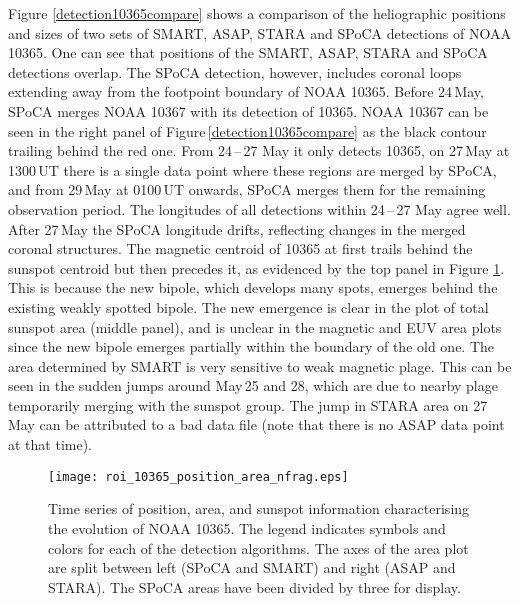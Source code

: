 Figure \ref{detection10365compare} shows a comparison of the heliographic
positions and sizes of two sets of \gls{SMART}, \gls{ASAP}, \gls{STARA} and \gls{SPoCA} detections of NOAA 10365. One can see that positions of the \gls{SMART}, \gls{ASAP}, \gls{STARA} and \gls{SPoCA} detections overlap. The \gls{SPoCA} detection, however, includes coronal loops extending away from the footpoint boundary of NOAA 10365.
Before 24\,May, \gls{SPoCA} merges NOAA 10367 with its detection of 10365. NOAA 10367 can be seen in the right panel of Figure\,\ref{detection10365compare} as the black contour trailing behind the red one. From 24\,--\,27 May it only detects 10365, on 27\,May at 1300\,UT there is a single data point where these regions are merged by \gls{SPoCA}, and from 29\,May at 0100\,UT onwards, \gls{SPoCA} merges them for the remaining observation period. The longitudes of all detections within 24\,--\,27 May agree well. After 27\,May the \gls{SPoCA} longitude drifts, reflecting changes in the merged coronal structures.
The magnetic centroid of 10365 at first trails behind the sunspot
centroid but then precedes it, as evidenced by the top panel in Figure
\ref{10365evolve_area_pos_num}. This is because the new bipole, which develops
many spots, emerges behind the existing weakly spotted bipole. The new emergence
is clear in the plot of total sunspot area (middle panel), and is unclear in the
magnetic and \gls{EUV} area plots since the new bipole emerges partially within the
boundary of the old one. The area determined by \gls{SMART} is very sensitive to weak
magnetic plage. This can be seen in the sudden jumps around May\,25 and
28, which are due to nearby plage temporarily merging with the sunspot group.   
The jump in \gls{STARA} area on 27\,May can be attributed to a bad data file (note that there is no \gls{ASAP} data point at that time).

\begin{figure}[!t]
\centerline{\texttt{[image: roi\_10365\_position\_area\_nfrag.eps]}}
\caption[NOAA 10365 property evolution.]{Time series of position, area, and sunspot information characterising
the evolution of NOAA 10365. The legend indicates symbols and colors for each
of the detection algorithms. The axes of the area plot are split between left
(SPoCA and SMART) and right (ASAP and STARA). The SPoCA areas have been divided
by three for display.}
\label{10365evolve_area_pos_num}
\end{figure}

